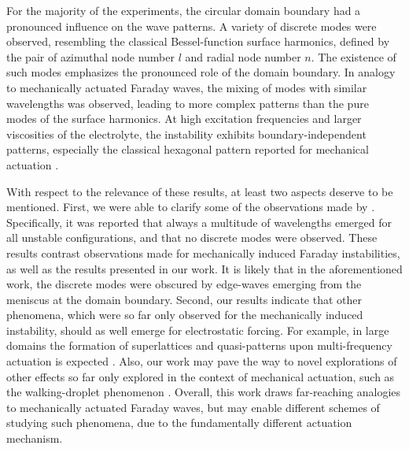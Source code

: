 \documentclass{jfm_arxiv}
\begin{document}
For the majority of the experiments, the circular domain boundary had a pronounced influence on the wave patterns. 
A variety of discrete modes were observed, resembling the classical Bessel-function surface harmonics, defined by the pair of azimuthal node number $l$ and radial node number $n$. 
The existence of such modes emphasizes the pronounced role of the domain boundary. 
In analogy to mechanically actuated Faraday waves, the mixing of modes with similar wavelengths was observed, leading to more complex patterns than the pure modes of the surface harmonics.
At high excitation frequencies and larger viscosities of the electrolyte, the instability exhibits boundary-independent patterns, especially the classical hexagonal pattern reported for mechanical actuation \citep{Edwards1994}.

With respect to the relevance of these results, at least two aspects deserve to be mentioned. 
First, we were able to clarify some of the observations made by \citet{Ward2019}. Specifically, it was reported that always a multitude of wavelengths emerged for all unstable configurations, and that no discrete modes were observed. These results contrast observations made for mechanically induced Faraday instabilities, as well as the results presented in our work. It is likely that in the aforementioned work, the discrete modes were obscured by edge-waves emerging from the meniscus at the domain boundary. 
Second, our results indicate that other phenomena, which were so far only observed for the mechanically induced instability, should as well emerge for electrostatic forcing. For example, in large domains the formation of superlattices and quasi-patterns upon multi-frequency actuation is expected \citep{Edwards1994}. Also, our work may pave the way to novel explorations of other effects so far only explored in the context of mechanical actuation, such as the walking-droplet phenomenon \citep{Couder2005, Bush2015, Fernandez-Mateo2021}.
Overall, this work draws far-reaching analogies to mechanically actuated Faraday waves, but may enable different schemes of studying such phenomena, due to the fundamentally different actuation mechanism. 



\end{document}
